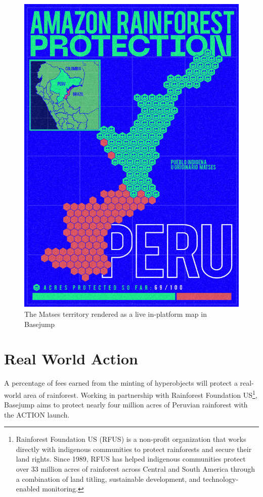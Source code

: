 \begin{figure}
  \centering
  \includegraphics[width=0.9\columnwidth]{images/image14.png}
  \caption{The Matses territory rendered as a live in-platform map in Basejump}
  \label{fig:matses_map}
\end{figure}

\section{Real World Action}

A percentage of fees earned from the minting of hyperobjects will protect a real-world area of rainforest. Working in partnership with Rainforest Foundation US\footnote{Rainforest Foundation US (RFUS) is a non-profit organization that works directly with indigenous communities to protect rainforests and secure their land rights. Since 1989, RFUS has helped indigenous communities protect over 33 million acres of rainforest across Central and South America through a combination of land titling, sustainable development, and technology-enabled monitoring.}, Basejump aims to protect nearly four million acres of Peruvian rainforest with the ACTION launch.

